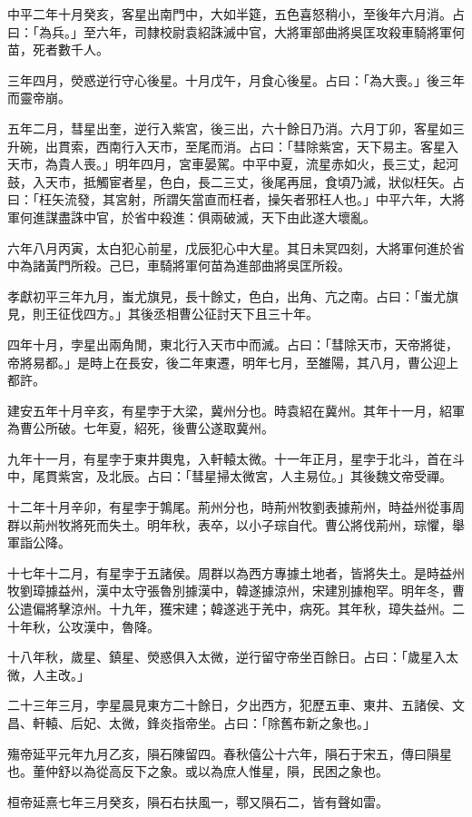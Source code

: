 \begin{pinyinscope}
中平二年十月癸亥，客星出南門中，大如半筵，五色喜怒稍小，至後年六月消。占曰：「為兵。」至六年，司隸校尉袁紹誅滅中官，大將軍部曲將吳匡攻殺車騎將軍何苗，死者數千人。

三年四月，熒惑逆行守心後星。十月戊午，月食心後星。占曰：「為大喪。」後三年而靈帝崩。

五年二月，彗星出奎，逆行入紫宮，後三出，六十餘日乃消。六月丁卯，客星如三升碗，出貫索，西南行入天市，至尾而消。占曰：「彗除紫宮，天下易主。客星入天市，為貴人喪。」明年四月，宮車晏駕。中平中夏，流星赤如火，長三丈，起河鼓，入天市，抵觸宦者星，色白，長二三丈，後尾再屈，食頃乃滅，狀似枉矢。占曰：「枉矢流發，其宮射，所謂矢當直而枉者，操矢者邪枉人也。」中平六年，大將軍何進謀盡誅中官，於省中殺進：俱兩破滅，天下由此遂大壞亂。

六年八月丙寅，太白犯心前星，戊辰犯心中大星。其日未冥四刻，大將軍何進於省中為諸黃門所殺。己巳，車騎將軍何苗為進部曲將吳匡所殺。

孝獻初平三年九月，蚩尤旗見，長十餘丈，色白，出角、亢之南。占曰：「蚩尤旗見，則王征伐四方。」其後丞相曹公征討天下且三十年。

四年十月，孛星出兩角閒，東北行入天市中而滅。占曰：「彗除天市，天帝將徙，帝將易都。」是時上在長安，後二年東遷，明年七月，至雒陽，其八月，曹公迎上都許。

建安五年十月辛亥，有星孛于大梁，冀州分也。時袁紹在冀州。其年十一月，紹軍為曹公所破。七年夏，紹死，後曹公遂取冀州。

九年十一月，有星孛于東井輿鬼，入軒轅太微。十一年正月，星孛于北斗，首在斗中，尾貫紫宮，及北辰。占曰：「彗星掃太微宮，人主易位。」其後魏文帝受禪。

十二年十月辛卯，有星孛于鶉尾。荊州分也，時荊州牧劉表據荊州，時益州從事周群以荊州牧將死而失土。明年秋，表卒，以小子琮自代。曹公將伐荊州，琮懼，舉軍詣公降。

十七年十二月，有星孛于五諸侯。周群以為西方專據土地者，皆將失土。是時益州牧劉璋據益州，漢中太守張魯別據漢中，韓遂據涼州，宋建別據枹罕。明年冬，曹公遣偏將擊涼州。十九年，獲宋建；韓遂逃于羌中，病死。其年秋，璋失益州。二十年秋，公攻漢中，魯降。

十八年秋，歲星、鎮星、熒惑俱入太微，逆行留守帝坐百餘日。占曰：「歲星入太微，人主改。」

二十三年三月，孛星晨見東方二十餘日，夕出西方，犯歷五車、東井、五諸侯、文昌、軒轅、后妃、太微，鋒炎指帝坐。占曰：「除舊布新之象也。」

殤帝延平元年九月乙亥，隕石陳留四。春秋僖公十六年，隕石于宋五，傳曰隕星也。董仲舒以為從高反下之象。或以為庶人惟星，隕，民困之象也。

桓帝延熹七年三月癸亥，隕石右扶風一，鄠又隕石二，皆有聲如雷。


\end{pinyinscope}